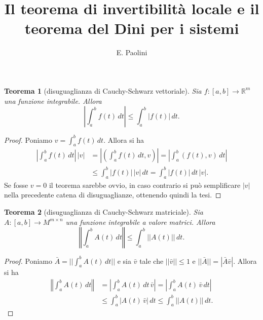 \documentclass[italian]{article}
\title{Il teorema di invertibilit\`a locale e il teorema del Dini per
  i sistemi}
\author{E. Paolini}
\newtheorem{theorem}{Teorema}
\theoremstyle{remark}
\newcommand{\R}{{\mathbb R}}            %
\begin{document}
\maketitle
\begin{theorem}[disuguaglianza di Cauchy-Schwarz vettoriale]
Sia $f\colon [a,b] \to \R^m$ una funzione integrabile. Allora
\[
  \left|\int_a^b f(t)\, dt \right| \le \int_a^b |f(t)|\, dt.
\]
\end{theorem}
\begin{proof}
Poniamo $v=\int_a^b f(t)\, dt$. 
Allora si ha
\begin{align*}
  \left|\int_a^b f(t)\, dt\right|\, |v| 
  & =  \left|\left(\int_a^b f(t)\, dt, v\right)\right|
    = \left|\int_a^b (f(t),v)\, dt\right| \\
  &\le \int_a^b |f(t)|\, |v|\, dt
    = \int_a^b |f(t)|\, dt \, |v|.
\end{align*}
Se fosse $v=0$ il teorema sarebbe ovvio, in caso contrario si pu\`o
semplificare $|v|$ nella precedente catena di disuguaglianze,
ottenendo quindi la tesi.
\end{proof}

\begin{theorem}[disuguaglianza di Cauchy-Schwarz matriciale]
Sia $A\colon [a,b]\to M^{m\times n}$ una funzione integrabile a valore
matrici. Allora 
\[
 \left\Vert \int_a^b A(t)\, dt \right\Vert \le \int_a^b ||A(t)||\, dt.
\]
\end{theorem}
\begin{proof}
Poniamo $\bar A = ||\int_a^b A(t)\, dt||$ e sia $\bar v$ tale che
$||\bar v||\le 1$ e $||\bar A|| = |\bar A \bar v|$. Allora si ha
\begin{align*}
\left\Vert\int_a^b A(t)\, dt\right\Vert 
  &= \left| \int_a^b A(t)\, dt\, \bar v\right|
  =  \left| \int_a^b A(t)\,\bar v \, dt \right|\\
  &\le \int_a^b |A(t)\, \bar v|\, dt
   \le \int_a^b ||A(t)||\, dt.
\end{align*}
\end{proof}
\end{document}

